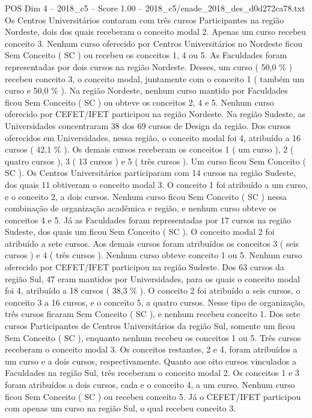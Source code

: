 \begin{textsample}{POS Dim 4 – 2018\_c5 – Score 1.00 – 2018\_c5/enade\_2018\_des\_d0d272ca78.txt}
Os Centros Universitários contaram com três cursos Participantes na região Nordeste, dois dos quais receberam o conceito modal 2.
Apenas um curso recebeu conceito 3.
Nenhum curso oferecido por Centros Universitários no Nordeste ficou Sem Conceito ( SC ) ou recebeu os conceitos 1, 4 ou 5.
As Faculdades foram representadas por dois cursos na região Nordeste.
Desses, um curso ( 50,0 \% ) recebeu conceito 3, o conceito modal, juntamente com o conceito 1 ( também um curso e 50,0 \% ).
Na região Nordeste, nenhum curso mantido por Faculdades ficou Sem Conceito ( SC ) ou obteve os conceitos 2, 4 e 5.
Nenhum curso oferecido por CEFET/IFET participou na região Nordeste.
Na região Sudeste, as Universidades concentraram 38 dos 69 cursos de Design da região.
Dos cursos oferecidos em Universidades, nessa região, o conceito modal foi 4, atribuído a 16 cursos ( 42,1 \% ).
Os demais cursos receberam os conceitos 1 ( um curso ), 2 ( quatro cursos ), 3 ( 13 cursos ) e 5 ( três cursos ).
Um curso ficou Sem Conceito ( SC ).
Os Centros Universitários participaram com 14 cursos na região Sudeste, dos quais 11 obtiveram o conceito modal 3.
O conceito 1 foi atribuído a um curso, e o conceito 2, a dois cursos.
Nenhum curso ficou Sem Conceito ( SC ) nessa combinação de organização acadêmica e região, e nenhum curso obteve os conceitos 4 e 5.
Já as Faculdades foram representadas por 17 cursos na região Sudeste, dos quais um ficou Sem Conceito ( SC ).
O conceito modal 2 foi atribuído a sete cursos.
Aos demais cursos foram atribuídos os conceitos 3 ( seis cursos ) e 4 ( três cursos ).
Nenhum curso obteve conceito 1 ou 5.
Nenhum curso oferecido por CEFET/IFET participou na região Sudeste.
Dos 63 cursos da região Sul, 47 eram mantidos por Universidades, para os quais o conceito modal foi 4, atribuído a 18 cursos ( 38,3 \% ).
O conceito 2 foi atribuído a seis cursos, o conceito 3 a 16 cursos, e o conceito 5, a quatro cursos.
Nesse tipo de organização, três cursos ficaram Sem Conceito ( SC ), e nenhum recebeu conceito 1.
Dos sete cursos Participantes de Centros Universitários da região Sul, somente um ficou Sem Conceito ( SC ), enquanto nenhum recebeu os conceitos 1 ou 5.
Três cursos receberam o conceito modal 3.
Os conceitos restantes, 2 e 4, foram atribuídos a um curso e a dois cursos, respectivamente.
Quanto aos oito cursos vinculados a Faculdades na região Sul, três receberam o conceito modal 2.
Os conceitos 1 e 3 foram atribuídos a dois cursos, cada e o conceito 4, a um curso.
Nenhum curso ficou Sem Conceito ( SC ) ou recebeu conceito 5.
Já o CEFET/IFET participou com apenas um curso na região Sul, o qual recebeu conceito 3.

\end{textsample}

